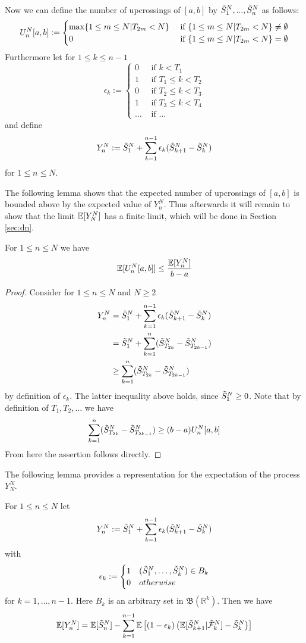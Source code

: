 \begin{defn}
\begin{align*}
	\end{align*}
	Now we can define the number of upcrossings of $[a, b]$ by $\tilde{S}_{1}^N, ..., \tilde{S}_{n}^N$ as follows:
	\[
	U_{n}^N[a,b] :=\begin{cases}  
	\max\{1\leq m \leq N | T_{2m} < N\} & \textrm{ if } \{1\leq m \leq N | T_{2m} < N\}\neq \emptyset\\
	0 &  \textrm{ if } \{1\leq m \leq N | T_{2m} < N\} = \emptyset
	\end{cases}
	\]
	Furthermore let for $1\leq k\leq n-1$
	\[ \epsilon_k := \begin{cases} 
	0 & \textrm{ if } k < T_1 \\
	1 & \textrm{ if } T_1 \leq k < T_2\\
	0 & \textrm{ if } T_2 \leq k < T_3\\
	1 & \textrm{ if } T_3 \leq k < T_4\\
	\dots & \textrm{ if } \dots
	\end{cases}
	\]
	and define
	$$Y_{n}^N := \tilde{S}_{1}^N + \sum\limits_{k=1}^{n-1} \epsilon_k (\tilde{S}_{k+1}^N-\tilde{S}_{k}^N)$$
	for $1\leq n\leq N$. 	
\end{defn}
%
The following lemma shows that the expected number of upcrossings of $[a,b]$ is bounded above by the expected value of $Y_n^N$. Thus afterwards it will remain to show that the limit $\mathbb{E}[Y_N^N]$ has a finite limit, which will be done in Section \ref{sec:dn}.
\begin{lemma}
	For $1\leq n\leq N$ we have
	$$\mathbb{E}[U_{n}^N[a,b]]\leq \frac{\mathbb{E}[Y_{n}^N]}{b-a}$$
	\label{lem:upcrossings_yn}
\end{lemma}
%
\begin{proof}
	Consider for $1\leq n\leq N$ and $N\geq 2$
	\begin{align*}
	Y_n^N &= \tilde{S}_{1}^N + \sum_{k=1}^{n-1}\epsilon_k(\tilde{S}_{k+1}^N-\tilde{S}_{k}^N)\\
	&= \tilde{S}_{1}^N + \sum_{k=1}^{n}(\tilde{S}_{T_{2k}}^N-\tilde{S}_{T_{2k-1}}^N)\\
	&\geq \sum_{k=1}^{n}(\tilde{S}_{T_{2k}}^N-\tilde{S}_{T_{2k-1}}^N)
	\end{align*}
	by definition of $\epsilon_k$. The latter inequality above holds, since $\tilde{S}_{1}^N\geq 0$. Note that by definition of $T_1, T_2, \dots$ we have
	$$\sum_{k=1}^{n}(\tilde{S}_{T_{2k}}^N-\tilde{S}_{T_{2k-1}}^N) \geq (b-a)U_{n}^N[a,b]$$
	From here the assertion follows directly.
\end{proof}
%
The following lemma provides a representation for the expectation of the process $Y_N^N$.
\begin{lemma}
	\label{lem:optional_skipping}
	For $1\leq n\leq N$ let
	$$Y_{n}^N := \tilde{S}_{1}^N + \sum_{k=1}^{n-1} \epsilon_k (\tilde{S}_{k+1}^N - \tilde{S}_{k}^N) $$
	with
	\[ \epsilon_k := \begin{cases} 
	1 & (\tilde{S}_{1}^N,\dots,\tilde{S}_{k}^N)\in B_k \\
	0 & otherwise 
	\end{cases}
	\]
	for $k=1,\dots, n-1$. Here $B_k$ is an arbitrary set in $\mathfrak{B}(\mathbb{R}^k)$. Then we have
	\begin{equation}
	\mathbb{E}[Y_{n}^N] = \mathbb{E}[\tilde{S}_{n}^N] - \sum_{k=1}^{n-1}\mathbb{E}\left[(1-\epsilon_k)\left(\mathbb{E}[\tilde{S}_{k+1}^N|\tilde{\mathcal{F}}_{k}^N]  - \tilde{S}_{k}^N \right)\right]
	\label{eq:ineq_yk}
	\end{equation}
\end{lemma}
